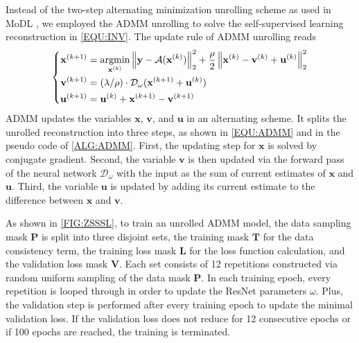 \documentclass[journal,twoside,web]{ieeecolor}
\newcommand{\argmin}{\operatornamewithlimits{argmin}}
\newcommand{\norm}[1]{\left\lVert#1\right\rVert}
\begin{document}
	Instead of the two-step alternating minimization unrolling scheme as used in MoDL
	\cite{aggarwal_2018_modl},
	we employed the ADMM unrolling
	to solve the self-supervised learning reconstruction
	in \cref{EQU:INV}. The update rule of ADMM unrolling reads
	\begin{equation} \label{EQU:ADMM}
		\left\{\begin{aligned}
			\mathbf{x}^{(k+1)} &= \argmin_{\mathbf{x}^{(k)}} \norm{\mathbf{y} - \mathcal{A}(\mathbf{x}^{(k)})}_2^2 + \frac{\rho}{2} \norm{ \mathbf{x}^{(k)} - \mathbf{v}^{(k)} + \mathbf{u}^{(k)}}_2^2 \\
			\mathbf{v}^{(k+1)} &= (\lambda/\rho) \cdot \mathcal{D}_{\omega} (\mathbf{x}^{(k+1)} + \mathbf{u}^{(k)}) \\
			\mathbf{u}^{(k+1)} &= \mathbf{u}^{(k)} + \mathbf{x}^{(k+1)} - \mathbf{v}^{(k+1)}
		\end{aligned}\right.
	\end{equation}
	ADMM updates the variables $\mathbf{x}$, $\mathbf{v}$,
	and $\mathbf{u}$ in an alternating scheme.
	It splits the unrolled reconstruction into three steps,
	as shown in \cref{EQU:ADMM} and in the pseudo code of \cref{ALG:ADMM}.
	First, the updating step for $\mathbf{x}$ is solved by conjugate gradient.
	Second, the variable $\mathbf{v}$ is then updated
	via the forward pass of the neural network $\mathcal{D}_{\omega}$
	with the input as the sum of current estimates
	of $\mathbf{x}$ and $\mathbf{u}$.
	Third, the variable $\mathbf{u}$ is updated
	by adding its current estimate to the difference
	between $\mathbf{x}$ and $\mathbf{v}$.

	As shown in \cref{FIG:ZSSSL}, to train an unrolled ADMM model, 
	the data sampling mask $\mathbf{P}$
	is split into three disjoint sets, 
	the training mask $\mathbf{T}$ for the data consistency term,
	the training loss mask $\mathbf{L}$ for the loss function calculation,
	and the validation loss mask $\mathbf{V}$.
	Each set consists of 12 repetitions constructed via random uniform sampling
	of the data mask $\mathbf{P}$.
	In each training epoch, every repetition is looped through
	in order to update the ResNet parameters $\omega$.
	Plus, the validation step is performed after every training epoch
	to update the minimal validation loss.
	If the validation loss does not reduce for 12 consecutive epochs or
	if 100 epochs are reached, the training is terminated.
\end{document}
